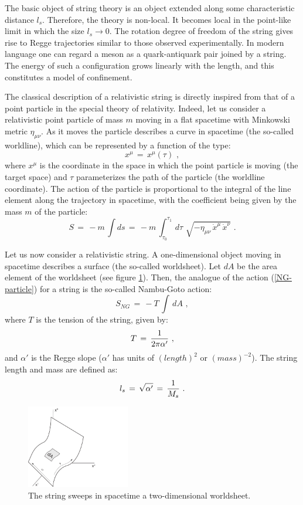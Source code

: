 \documentclass[12pt,notitlepage]{article}
\newcommand{\beq}{\begin{equation}}
\newcommand{\eeq}{\end{equation}}
\begin{document}
The basic object of string theory is an object extended along some characteristic distance $l_s$. Therefore, the  theory is non-local. It becomes local in the point-like  limit in which the size $l_s\to 0$.  The rotation degree of freedom of the string gives rise to Regge trajectories similar to those observed experimentally. In modern language one can regard a meson as a quark-antiquark  pair joined by a string. The energy of such a configuration grows linearly with the length, and this constitutes a model of confinement. 


The classical description of a relativistic string is directly inspired from that of a point particle in the special theory of relativity. Indeed, let us consider a relativistic point particle  of mass $m$ moving in a flat spacetime with Minkowski metric $\eta_{\mu\nu}$. As it moves the particle describes a curve in spacetime (the so-called worldline), which can be represented by a function of the type:
\beq
x^{\mu}\,=\,x^{\mu}(\tau)\,\,,
\eeq
where $x^{\mu}$ is the coordinate in the space in which the point particle is moving (the target space) and  $\tau$  parameterizes the path of the particle (the worldline coordinate). The action  of the particle is proportional to the integral of the  line element along the trajectory in spacetime, with the coefficient being given by the mass $m$ of the particle:
\beq
S\,=\,-m\,\int ds\,=\,
-m\,\int_{\tau_0}^{\tau_1}\,d\tau \,\,\sqrt{-\eta_{\mu\nu}\,\dot x^{\mu}\,\dot x^{\nu}}\,\,.
\label{NG-particle}
\eeq






Let us now consider a relativistic string. A one-dimensional object moving in spacetime describes a surface (the so-called worldsheet). Let $dA$ be the area element of the worldsheet (see figure \ref{worldsheet}). Then, the analogue of the action (\ref{NG-particle}) for  a string is the so-called Nambu-Goto action:
\beq
S_{NG}\,=\,-T\,\int \,dA\,\,,
\label{NG-string}
\eeq
where $T$ is the tension of the string, given by:
\beq
T\,=\,{1\over 2\pi\alpha'}\,\,,
\eeq
and $\alpha'$ is the Regge slope ($\alpha'$ has units of $(length)^2 $ or $(mass)^{-2}$). The string length and mass are defined as:
\beq
l_s\,=\,\sqrt{\alpha'}\,=\,{1\over M_s}\,\,.
\label{ls}
\eeq

\begin{figure}[ht]
\center
\qquad\qquad\includegraphics[width=0.4\textwidth]{Wsheet.pdf}
\caption{The string sweeps in spacetime a two-dimensional worldsheet. } 
\label{worldsheet}
\end{figure}
\end{document}
